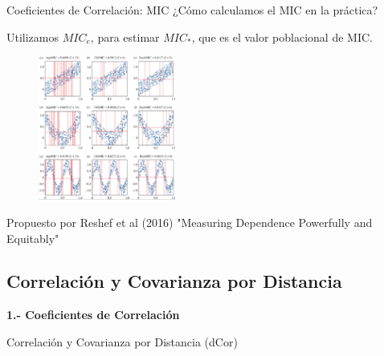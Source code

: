 \documentclass{beamer}
\begin{document}
\begin{frame}{Coeficientes de Correlación: MIC}
    ¿Cómo calculamos el MIC en la práctica?


    Utilizamos $MIC_{e}$, para estimar $MIC_*$, que es el valor poblacional de MIC.

    \begin{figure}
        \centering
        \includegraphics[width=0.4\textwidth]{rsos201424f03.png}
    \end{figure}
    \pause
    Propuesto por Reshef et al (2016) "Measuring Dependence Powerfully and Equitably"
\end{frame}


\subsection{Correlaci\'on y Covarianza por Distancia}
\begin{frame}
    \begin{center}
        {\LARGE\bf 1.-  Coeficientes de Correlación}
        \pause

        {\Large  Correlaci\'on y Covarianza por Distancia (dCor)}
    \end{center}
\end{frame}
\end{document}
